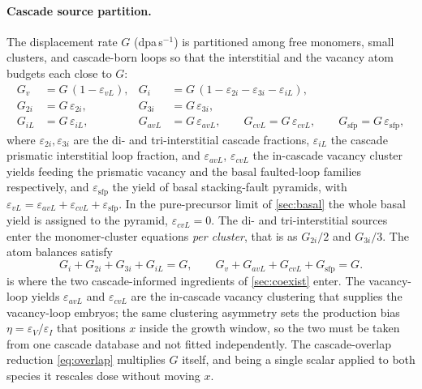 \documentclass{article}
\begin{document}
\paragraph{Cascade source partition.} The displacement rate $G$ (dpa\,s$^{-1}$)
is partitioned among free monomers, small clusters, and cascade-born loops so
that the interstitial and the vacancy atom budgets each close to $G$:
\begin{align}
G_v   &= G\,(1-\varepsilon_{vL}), &
G_i   &= G\,(1-\varepsilon_{2i}-\varepsilon_{3i}-\varepsilon_{iL}),\\
G_{2i}&= G\,\varepsilon_{2i}, &
G_{3i}&= G\,\varepsilon_{3i},\\
G_{iL}&= G\,\varepsilon_{iL}, &
G_{avL}&= G\,\varepsilon_{avL},\qquad
G_{cvL} = G\,\varepsilon_{cvL},\qquad
G_{\mathrm{sfp}} = G\,\varepsilon_{\mathrm{sfp}},
\label{eq:cascade}
\end{align}
where $\varepsilon_{2i},\varepsilon_{3i}$ are the di- and tri-interstitial
cascade fractions, $\varepsilon_{iL}$ the cascade prismatic interstitial loop
fraction, and $\varepsilon_{avL}$, $\varepsilon_{cvL}$ the in-cascade vacancy
cluster yields feeding the prismatic vacancy and the basal faulted-loop
families respectively, and $\varepsilon_{\mathrm{sfp}}$ the yield of basal
stacking-fault pyramids, with $\varepsilon_{vL}=\varepsilon_{avL}
+\varepsilon_{cvL}+\varepsilon_{\mathrm{sfp}}$. In the pure-precursor limit of
\cref{sec:basal} the whole basal yield is assigned to the pyramid,
$\varepsilon_{cvL}=0$. The di- and tri-interstitial sources enter the monomer-cluster
equations \emph{per cluster}, that is as $G_{2i}/2$ and $G_{3i}/3$. The atom
balances satisfy
\begin{equation}
G_i+G_{2i}+G_{3i}+G_{iL}=G,\qquad
G_v+G_{avL}+G_{cvL}+G_{\mathrm{sfp}}=G.
\label{eq:cascade-balance}
\end{equation}
 is where the two cascade-informed ingredients of
\cref{sec:coexist} enter. The vacancy-loop yields $\varepsilon_{avL}$ and
$\varepsilon_{cvL}$ are the in-cascade vacancy clustering that supplies the
vacancy-loop embryos; the same clustering asymmetry sets the production bias
$\eta=\varepsilon_V/\varepsilon_I$ that positions $x$ inside the growth window,
so the two must be taken from one cascade database and not fitted independently.
The cascade-overlap reduction \cref{eq:overlap} multiplies $G$ itself, and being
a single scalar applied to both species it rescales dose without moving $x$.
\end{document}

